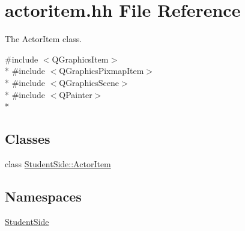 \hypertarget{actoritem_8hh}{\section{actoritem.\-hh File Reference}
\label{actoritem_8hh}
}


The Actor\-Item class.  


{\ttfamily \#include $<$Q\-Graphics\-Item$>$}\\*
{\ttfamily \#include $<$Q\-Graphics\-Pixmap\-Item$>$}\\*
{\ttfamily \#include $<$Q\-Graphics\-Scene$>$}\\*
{\ttfamily \#include $<$Q\-Painter$>$}\\*
\subsection*{Classes}
\begin{DoxyCompactItemize}
\item 
class \hyperlink{class_student_side_1_1_actor_item}{Student\-Side\-::\-Actor\-Item}
\end{DoxyCompactItemize}
\subsection*{Namespaces}
\begin{DoxyCompactItemize}
\item 
\hyperlink{namespace_student_side}{Student\-Side}
\end{DoxyCompactItemize}
